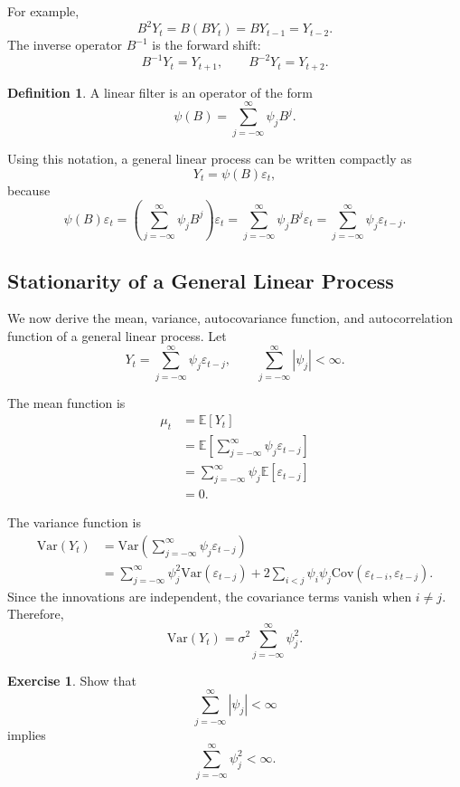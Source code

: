 \documentclass[12pt,oneside]{book}
\numberwithin{equation}{section}
\theoremstyle{definition}
\newtheorem{definition}{Definition}[section]
\newtheorem{exercise}{Exercise}[section]
\theoremstyle{plain}
\theoremstyle{remark}
\newcommand{\E}{\mathbb{E}}
\newcommand{\Var}{\mathrm{Var}}
\newcommand{\Cov}{\mathrm{Cov}}
\begin{document}
For example,
\[
B^2Y_t
=
B(BY_t)
=
BY_{t-1}
=
Y_{t-2}.
\]
The inverse operator $B^{-1}$ is the forward shift:
\[
B^{-1}Y_t=Y_{t+1},
\qquad
B^{-2}Y_t=Y_{t+2}.
\]

\begin{definition}
A linear filter is an operator of the form
\[
\psi(B)
=
\sum_{j=-\infty}^{\infty}\psi_jB^j.
\]
\end{definition}

Using this notation, a general linear process can be written compactly as
\[
Y_t=\psi(B)\varepsilon_t,
\]
because
\[
\psi(B)\varepsilon_t
=
\left(\sum_{j=-\infty}^{\infty}\psi_jB^j\right)\varepsilon_t
=
\sum_{j=-\infty}^{\infty}\psi_jB^j\varepsilon_t
=
\sum_{j=-\infty}^{\infty}\psi_j\varepsilon_{t-j}.
\]

\subsection*{Stationarity of a General Linear Process}

We now derive the mean, variance, autocovariance function, and autocorrelation function of a general linear process. Let
\[
Y_t
=
\sum_{j=-\infty}^{\infty}\psi_j\varepsilon_{t-j},
\qquad
\sum_{j=-\infty}^{\infty}|\psi_j|<\infty.
\]

The mean function is
\begin{align*}
\mu_t
&=
\E[Y_t] \\
&=
\E\left[
\sum_{j=-\infty}^{\infty}\psi_j\varepsilon_{t-j}
\right] \\
&=
\sum_{j=-\infty}^{\infty}\psi_j\E[\varepsilon_{t-j}] \\
&=
0.
\end{align*}

The variance function is
\begin{align*}
\Var(Y_t)
&=
\Var\left(
\sum_{j=-\infty}^{\infty}\psi_j\varepsilon_{t-j}
\right) \\
&=
\sum_{j=-\infty}^{\infty}\psi_j^2\Var(\varepsilon_{t-j})
+
2\sum_{i<j}\psi_i\psi_j
\Cov(\varepsilon_{t-i},\varepsilon_{t-j}).
\end{align*}
Since the innovations are independent, the covariance terms vanish when $i\neq j$. Therefore,
\[
\Var(Y_t)
=
\sigma^2\sum_{j=-\infty}^{\infty}\psi_j^2.
\]

\begin{exercise}
Show that
\[
\sum_{j=-\infty}^{\infty}|\psi_j|<\infty
\]
implies
\[
\sum_{j=-\infty}^{\infty}\psi_j^2<\infty.
\]
\end{exercise}
\end{document}
